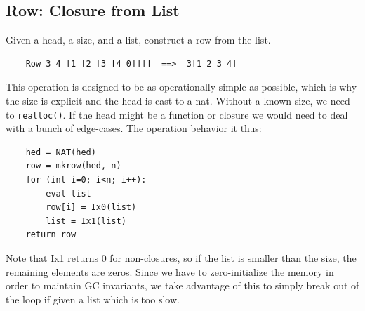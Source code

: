 \subsection{Row: Closure from List}

Given a head, a size, and a list, construct a row from the list.

\begin{verbatim}
    Row 3 4 [1 [2 [3 [4 0]]]]  ==>  3[1 2 3 4]
\end{verbatim}

This operation is designed to be as operationally simple as possible,
which is why the size is explicit and the head is cast to a nat.  Without
a known size, we need to \lstinline|realloc()|.  If the head might be
a function or closure we would need to deal with a bunch of edge-cases.
The operation behavior it thus:

\begin{verbatim}
    hed = NAT(hed)
    row = mkrow(hed, n)
    for (int i=0; i<n; i++):
        eval list
        row[i] = Ix0(list)
        list = Ix1(list)
    return row
\end{verbatim}

Note that Ix1 returns 0 for non-closures, so if the list is smaller
than the size, the remaining elements are zeros.  Since we have to
zero-initialize the memory in order to maintain GC invariants, we take
advantage of this to simply break out of the loop if given a list which
is too slow.

